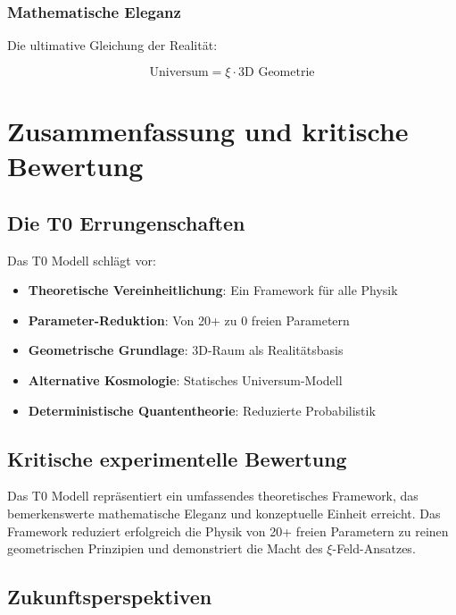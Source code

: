 \documentclass[12pt,a4paper]{report}
\begin{document}
	\subsection{Mathematische Eleganz}
	
	Die ultimative Gleichung der Realität:
	
	\begin{equation}
		\boxed{\text{Universum} = \xi \cdot \text{3D Geometrie}}
	\end{equation}
	
	\chapter{Zusammenfassung und kritische Bewertung}
	
	\section{Die T0 Errungenschaften}
	
	Das T0 Modell schlägt vor:
	
	\begin{itemize}
		\item \textbf{Theoretische Vereinheitlichung}: Ein Framework für alle Physik
		\item \textbf{Parameter-Reduktion}: Von 20+ zu 0 freien Parametern
		\item \textbf{Geometrische Grundlage}: 3D-Raum als Realitätsbasis
		\item \textbf{Alternative Kosmologie}: Statisches Universum-Modell
		\item \textbf{Deterministische Quantentheorie}: Reduzierte Probabilistik
	\end{itemize}
	
	\section{Kritische experimentelle Bewertung}
	
	Das T0 Modell repräsentiert ein umfassendes theoretisches Framework, das bemerkenswerte mathematische Eleganz und konzeptuelle Einheit erreicht. Das Framework reduziert erfolgreich die Physik von 20+ freien Parametern zu reinen geometrischen Prinzipien und demonstriert die Macht des $\xi$-Feld-Ansatzes.
	
	\section{Zukunftsperspektiven}
	
\end{document}
